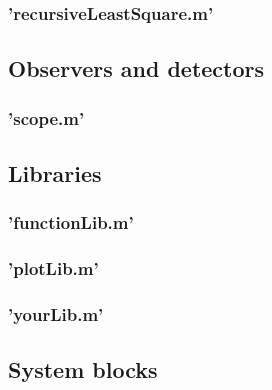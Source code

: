 {{{		}
		\subsubsection{'recursiveLeastSquare.m'} {
			
		}
	}

	\subsection{Observers and detectors} {
		\subsubsection{'scope.m'} {
			
		}
	}
	
	\subsection{Libraries} {
		\subsubsection{'functionLib.m'} {
			
		}
		\subsubsection{'plotLib.m'} {
			
		}
		\subsubsection{'yourLib.m'} {
			
		}
	}
	\subsection{System blocks} {
		
	}
	
}